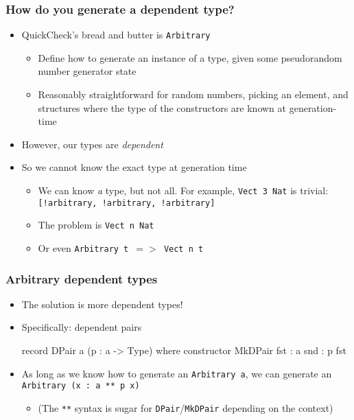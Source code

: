 \documentclass[compress,handout]{beamer}
\begin{document}
\begin{frame}
  \frametitle{How do you generate a dependent type?}

  \begin{itemize}
    \item QuickCheck's bread and butter is \texttt{Arbitrary}
    \begin{itemize}
      \item Define how to generate an instance of a type, given some
            pseudorandom number generator state
      \item Reasonably straightforward for random numbers, picking an element,
            and structures where the type of the constructors are known at
            generation-time
    \end{itemize}
    \item However, our types are \textit{dependent}
    \item So we cannot know the exact type at generation time
    \begin{itemize}
      \item We can know \textit{a} type, but not all. For example, \texttt{Vect
            3 Nat} is trivial: \texttt{[!arbitrary, !arbitrary, !arbitrary]}
      \item The problem is \texttt{Vect n Nat}
      \item Or even \texttt{Arbitrary t $=>$ Vect n t}
    \end{itemize}
  \end{itemize}

\end{frame}


\begin{frame}[fragile]
  \frametitle{Arbitrary dependent types}

  \begin{itemize}
    \item The solution is more dependent types!
    \item Specifically: dependent pairs

    \vspace*{-6mm}
    \begin{idrislisting}
record DPair a (p : a -> Type) where
  constructor MkDPair
  fst : a
  snd : p fst
    \end{idrislisting}
    \vspace*{-3mm}

    \item As long as we know how to generate an {\textasciigrave
          \texttt{Arbitrary a}\textasciigrave}, we can generate an
          {\textasciigrave\texttt{Arbitrary (x : a ** p x)}\textasciigrave}
    \begin{itemize}
      \item (The \texttt{**} syntax is sugar for \texttt{DPair}/\texttt{MkDPair}
            depending on the context)
    \end{itemize}
  \end{itemize}

\end{frame}
\end{document}
